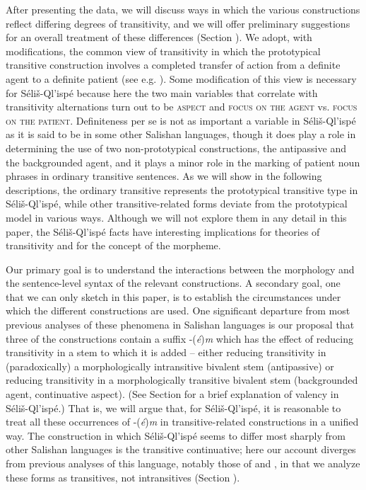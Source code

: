 \documentclass[output=paper,colorlinks,citecolor=brown]{langscibook}
\begin{document}
  After presenting the data, we will discuss ways in which the
  various constructions reflect differing degrees of transitivity,
  and we will offer preliminary suggestions for an overall treatment
  of these differences (Section ).  We adopt, with modifications, the
  common view of transitivity in which the prototypical transitive
  construction involves a completed transfer of action from a
  definite agent to a definite patient (see
  e.g. \citealt{Hopper&Thompson:1980}).  Some modification of this view is
  necessary for
  S\'eli\v{s}-Ql'isp\'e because here the two main variables that
  correlate with transitivity alternations turn out to be \textsc{aspect} and \textsc{focus on the agent} vs. \textsc{focus on the
    patient}.  Definiteness per se is not as important a variable in
  S\'eli\v{s}-Ql'isp\'e as it is said to be in some other Salishan
  languages, though it does play a role in determining the use of two
  non-prototypical constructions, the antipassive and the
  backgrounded agent, and it plays a minor role in the marking of
  patient noun phrases in ordinary transitive sentences.  As we will
  show in the following descriptions, the ordinary transitive
  represents the prototypical transitive type in
  S\'eli\v{s}-Ql'isp\'e, while other transitive-related forms deviate
  from the prototypical model in various ways.  Although we will not
  explore them in any detail in this paper, the S\'eli\v{s}-Ql'isp\'e
  facts have interesting implications for theories of transitivity
  and for the concept of the morpheme.

  Our primary goal is to understand the interactions between the
  morphology and the sentence-level syntax of the relevant
  constructions.  A secondary goal, one that we can only sketch in
  this paper, is to establish the circumstances under which the
  different constructions are used.  One significant departure from
  most previous analyses of these phenomena in Salishan languages is
  our proposal that three of the constructions contain a suffix
  -(\emph{\'e})\emph{m} which has the effect of reducing transitivity
  in a stem to which it is added -- either reducing transitivity in
  (paradoxically) a morphologically intransitive bivalent stem
  (antipassive) or reducing transitivity in a morphologically
  transitive bivalent stem (backgrounded agent, continuative aspect).
  (See Section  for a brief explanation of valency in
  S\'eli\v{s}-Ql'isp\'e.) That is, we will argue that, for
  S\'eli\v{s}-Ql'isp\'e, it is reasonable to treat all these
  occurrences of -(\emph{\'e})\emph{m} in transitive-related
  constructions in a unified way.  The construction in which
  S\'eli\v{s}-Ql'isp\'e seems to differ most sharply from other
  Salishan languages is the transitive continuative; here our account
  diverges from previous analyses of this language, notably those of
  \citet{Kroeber:1999} and \citet{Vogt:1940}, in
  that we analyze these
  forms as transitives, not intransitives (Section ).
\end{document}
